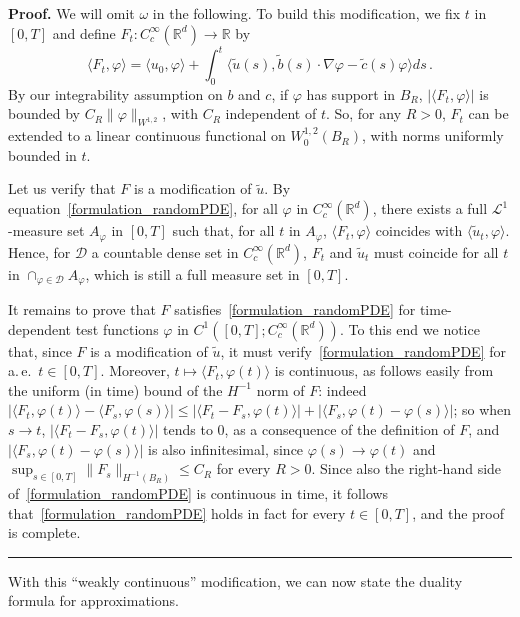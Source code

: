 \documentclass[a4paper,10pt]{article}
\newenvironment{proof}[1][Proof]{\noindent\textbf{#1.} }{\ \rule{0.5em}{0.5em}}
\newcommand{\mr}{\mathbb{R}}
\newcommand{\mc}{\mathcal}
\newcommand{\lan}{\langle}
\newcommand{\ran}{\rangle}
\newcommand{\td}{\tilde}
\begin{document}
\begin{proof}
We will omit $\omega$ in the following. To build this modification, we fix $t$ in $[0,T]$ and define $F_t \colon C^\infty_c(\mr^d) \rightarrow\mr$ by
\begin{equation*}
\lan F_t,\varphi\ran=\lan u_0,\varphi\ran +\int^t_0\lan \td{u}(s),\td{b}(s)\cdot\nabla\varphi-\td{c}(s)\varphi\ran ds \,.
\end{equation*}
By our integrability assumption on $b$ and $c$, if $\varphi$ has support in $B_R$, $|\lan F_t,\varphi\ran|$ is bounded by $C_R\|\varphi\|_{W^{1,2}}$, with $C_R$ independent of $t$. So, for any $R>0$, $F_t$ can be extended to a linear continuous functional on $W^{1,2}_0(B_R)$, with norms uniformly bounded in $t$.

Let us verify that $F$ is a modification of $\td{u}$. By equation~\eqref{formulation_randomPDE}, for all $\varphi$ in $C^\infty_c(\mr^d)$, there exists a full $\mc{L}^1$-measure set $A_\varphi$ in $[0,T]$ such that, for all $t$ in $A_\varphi$, $\lan F_t,\varphi\ran$ coincides with $\lan \td{u}_t,\varphi\ran$. Hence, for $\mc{D}$ a countable dense set in $C^\infty_c(\mr^d)$, $F_t$ and $\td{u}_t$ must coincide for all $t$ in $\cap_{\varphi\in\mc{D}}A_{\varphi}$, which is still a full measure set in $[0,T]$.

It remains to prove that $F$ satisfies~\eqref{formulation_randomPDE} for time-dependent test functions $\varphi$ in $C^1([0,T];C^\infty_c(\mr^d))$. To this end we notice that, since $F$ is a modification of $\td{u}$, it must verify~\eqref{formulation_randomPDE} for a.\,e.\ $t \in [0,T]$. Moreover, $t \mapsto \lan F_t,\varphi(t)\ran$ is continuous, as follows easily from the uniform (in time) bound of the $H^{-1}$ norm of $F$: indeed $|\lan F_t,\varphi(t)\ran-\lan F_s,\varphi(s)\ran|\le |\lan F_t-F_s,\varphi(t)\ran|+|\lan F_s,\varphi(t)-\varphi(s)\ran|$; so when $s\rightarrow t$, $|\lan F_t-F_s,\varphi(t)\ran|$ tends to $0$, as a consequence of the definition of $F$, and $|\lan F_s,\varphi(t)-\varphi(s)\ran|$ is also infinitesimal, since $\varphi(s)\rightarrow\varphi(t)$ and $\sup_{s\in[0,T]}\|F_s\|_{H^{-1}(B_R)} \leq C_R$ for every $R>0$. Since also the right-hand side of~\eqref{formulation_randomPDE} is continuous in time, it follows that~\eqref{formulation_randomPDE} 
holds in fact for every $t \in [0,T]$, and 
the proof is complete.
\end{proof}

With this ``weakly continuous'' modification, we can now state the duality formula for approximations.
\end{document}
